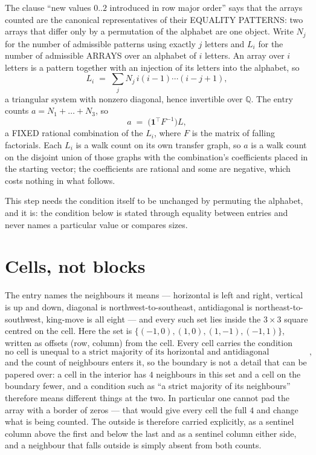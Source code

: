 \documentclass[11pt,a4paper]{article}
\theoremstyle{plain}
\theoremstyle{definition}
\begin{document}
The clause ``new values $0..2$ introduced in row major order'' says that the arrays
counted are the canonical representatives of their EQUALITY PATTERNS: two arrays that differ
only by a permutation of the alphabet are one object. Write $N_j$ for the number of admissible
patterns using exactly $j$ letters and $L_i$ for the number of admissible ARRAYS over an
alphabet of $i$ letters. An array over $i$ letters is a pattern together with an injection of
its letters into the alphabet, so
\[
L_i\;=\;\sum_{j}N_j\,i(i-1)\cdots(i-j+1),
\]
a triangular system with nonzero diagonal, hence invertible over $\mathbb{Q}$. The entry
counts $a=N_1+\dots+N_{3}$, so
\[
a\;=\;\bigl(\mathbf{1}^{\!\top}F^{-1}\bigr)L ,
\]
a FIXED rational combination of the $L_i$, where $F$ is the matrix of falling factorials.
Each $L_i$ is a walk count on its own transfer graph, so $a$ is a walk count on the disjoint
union of those graphs with the combination's coefficients placed in the starting vector; the
coefficients are rational and some are negative, which costs nothing in what follows.

This step needs the condition itself to be unchanged by permuting the alphabet, and it is:
the condition below is stated through equality between entries and never names a particular
value or compares sizes.

\section{Cells, not blocks}

The entry names the neighbours it means --- horizontal is left and right, vertical is up and
down, diagonal is northwest-to-southeast, antidiagonal is northeast-to-southwest, king-move is
all eight --- and every such set lies inside the $3\times3$ square centred on the cell. Here
the set is $\{(-1,0), (1,0), (1,-1), (-1,1)\}$, written as offsets (row, column) from the cell. Every cell carries
the condition
\[
\text{no cell is unequal to a strict majority of its horizontal and antidiagonal neighbours},
\]
and the count of neighbours enters it, so the boundary is not a detail that can be papered
over: a cell in the interior has $4$ neighbours in this set and a cell on the boundary
fewer, and a condition such as ``a strict majority of its neighbours'' therefore means
different things at the two. In particular one cannot pad the array with a border of zeros ---
that would give every cell the full $4$ and change what is being counted. The outside is
therefore carried
explicitly, as a sentinel column above the first and below the last and as a sentinel column
either side, and a neighbour that falls outside is simply absent from both counts.
\end{document}

